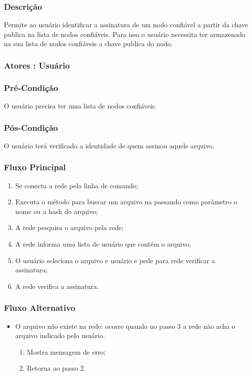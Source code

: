 \subsubsection{Descrição}
Permite ao usuário identificar a assinatura de um nodo confiável a partir da chave publica na lista de nodos confiáveis. Para isso o usuário necessita ter armazenado na sua lista de nodos confiáveis a chave publica do nodo.
\subsubsection{Atores : Usuário}
\subsubsection{Pré-Condição}
O usuário precisa ter uma lista de nodos confiáveis.
\subsubsection{Pós-Condição}
O usuário terá verificado a identidade de quem assinou aquele arquivo.
\subsubsection{Fluxo Principal}
\begin{enumerate}
    \item Se conecta a rede pela linha de comando;
    \item Executa o método para buscar um arquivo na passando como parâmetro o nome ou a hash do arquivo;
    \item A rede pesquisa o arquivo pela rede;
    \item A rede informa uma lista de usuário que contém o arquivo;
    \item O usuário seleciona o arquivo e usuário e pede para rede verificar a assinatura;
    \item A rede verifica a assinatura.
\end{enumerate}
\subsubsection{Fluxo Alternativo}
\begin{itemize}
    \item O arquivo não existe na rede: ocorre quando no passo 3 a rede não acha o arquivo indicado pelo usuário.
    \begin{enumerate}
        \item Mostra mensagem de erro;
        \item Retorna ao passo 2.
    \end{enumerate}
\end{itemize}


